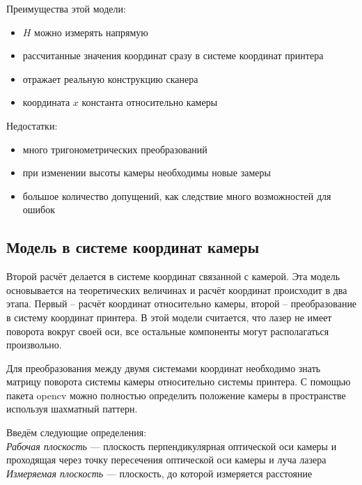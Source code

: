            Преимущества этой модели:
            \begin{itemize}
                \item $ H $ можно измерять напрямую
                \item рассчитанные значения координат сразу в системе координат принтера
                \item отражает реальную конструкцию сканера
                \item координата $ x $ константа относительно камеры
            \end{itemize}
            
            Недостатки:
            \begin{itemize}
                \item много тригонометрических преобразований
                \item при изменении высоты камеры необходимы новые замеры
                \item большое количество допущений, как следствие много возможностей для ошибок
            \end{itemize}

        \subsection{Модель в системе координат камеры}
            Второй расчёт делается в системе координат связанной с камерой. Эта модель основывается на теоретических величинах и расчёт координат происходит в два этапа. Первый -- расчёт координат относительно камеры, второй -- преобразование в систему координат принтера. В этой модели считается, что лазер не имеет поворота вокруг своей оси, все остальные компоненты могут располагаться произвольно.
            
            Для преобразования между двумя системами координат необходимо знать матрицу поворота системы камеры относительно системы принтера. С помощью пакета opencv можно полностью определить положение камеры в пространстве используя шахматный паттерн.

            Введём следующие определения:\\
            \textit{Рабочая плоскость} --- плоскость перпендикулярная оптической оси камеры и проходящая через точку пересечения оптической оси камеры и луча лазера\\
            \textit{Измеряемая плоскость} --- плоскость, до которой измеряется расстояние 

